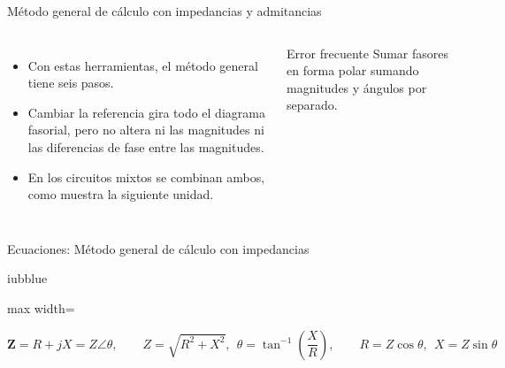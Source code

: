 \documentclass[aspectratio=169,11pt,xcolor={table}]{beamer}
\begin{document}
\begin{frame}{{\normalsize Método general de cálculo con impedancias y admitancias}}
\begin{columns}[c,onlytextwidth]
\small
\begin{itemize}\setlength{\itemsep}{4pt}
  \item Con estas herramientas, el método general tiene seis pasos.
  \item Cambiar la referencia gira todo el diagrama fasorial, pero no altera ni las magnitudes ni las diferencias de fase entre las magnitudes.
  \item En los circuitos mixtos se combinan ambos, como muestra la siguiente unidad.
\end{itemize}
\begin{cardO}{Error frecuente}
\footnotesize Sumar fasores en forma polar sumando magnitudes y ángulos por separado.
\end{cardO}
\end{columns}
\end{frame}

\begin{frame}{{\normalsize Ecuaciones: Método general de cálculo con impedancias}}
\begin{cajaplana}{iubblue}
\centering
\begin{adjustbox}{max width=\linewidth}
\begin{minipage}{1.27\linewidth}
{\large
\begin{equation*}
  \mathbf{Z} = R + jX = Z\angle\theta, \qquad Z = \sqrt{R^{2} + X^{2}},\ \ \theta = \tan^{-1}\!\left(\frac{X}{R}\right), \qquad R = Z\cos\theta,\ \ X = Z\sin\theta
\end{equation*}
}
\end{minipage}
\end{adjustbox}
\end{cajaplana}
\end{frame}
\end{document}
